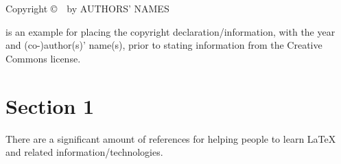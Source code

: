 \documentclass[letter,12pt]{article}
\begin{document}
\begin{center} 
Copyright \copyright\ \the\year\ by AUTHORS' NAMES
\end{center}
\doclicenseThis

\cite{Sutton2018} is an example for placing the copyright declaration/information, with the year and (co-)author(s)' name(s), prior to stating information from the Creative Commons license.

\begin{abstract} 
Insert abstract here. More stuff to be included.
\end{abstract}





\section{Section 1}
\label{sec:mysection1}

There are a significant amount of references for helping people to learn \LaTeX \cite{Voss2011,vanDongen2012,Syropoulos2003,Raymond2004,Mittelbach2004,Lamport1994,Krishnan2003,Krantz2001,Kottwitz2011,Koranne2011,Kopka2004,Knuth1999,Hoenig1998,Higham1998,Haralambous2007,Griffiths1997,Gratzer2007,Goossens2007,Goossens1999,Goossens1997,Diller1999,Bindner2011,Berry2009,UITCambridge2011,Scharrer2011,Pakin2008,Cormen2010,Syropoulos2004,Hamalainen2006} and related information/technologies.



















%
%
%

{\linespread{1}


}
\end{document}
